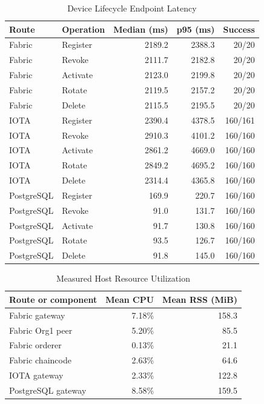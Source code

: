 \begin{table}[t]
\caption{Device Lifecycle Endpoint Latency}
\label{tab:lifecycle}
\centering
\footnotesize
\begin{tabular}{@{}llrrr@{}}
\toprule
Route & Operation & Median (ms) & p95 (ms) & Success \\
\midrule
Fabric & Register & 2189.2 & 2388.3 & 20/20 \\
Fabric & Revoke & 2111.7 & 2182.8 & 20/20 \\
Fabric & Activate & 2123.0 & 2199.8 & 20/20 \\
Fabric & Rotate & 2119.5 & 2157.2 & 20/20 \\
Fabric & Delete & 2115.5 & 2195.5 & 20/20 \\
IOTA & Register & 2390.4 & 4378.5 & 160/161 \\
IOTA & Revoke & 2910.3 & 4101.2 & 160/160 \\
IOTA & Activate & 2861.2 & 4669.0 & 160/160 \\
IOTA & Rotate & 2849.2 & 4695.2 & 160/160 \\
IOTA & Delete & 2314.4 & 4365.8 & 160/160 \\
PostgreSQL & Register & 169.9 & 220.7 & 160/160 \\
PostgreSQL & Revoke & 91.0 & 131.7 & 160/160 \\
PostgreSQL & Activate & 91.7 & 130.8 & 160/160 \\
PostgreSQL & Rotate & 93.5 & 126.7 & 160/160 \\
PostgreSQL & Delete & 91.8 & 145.0 & 160/160 \\
\bottomrule
\end{tabular}
\end{table}

\begin{table}[t]
\caption{Measured Host Resource Utilization}
\label{tab:resources}
\centering
\footnotesize
\begin{tabular}{@{}lrr@{}}
\toprule
Route or component & Mean CPU & Mean RSS (MiB) \\
\midrule
Fabric gateway & 7.18\% & 158.3 \\
Fabric Org1 peer & 5.20\% & 85.5 \\
Fabric orderer & 0.13\% & 21.1 \\
Fabric chaincode & 2.63\% & 64.6 \\
IOTA gateway & 2.33\% & 122.8 \\
PostgreSQL gateway & 8.58\% & 159.5 \\
\bottomrule
\end{tabular}
\end{table}

